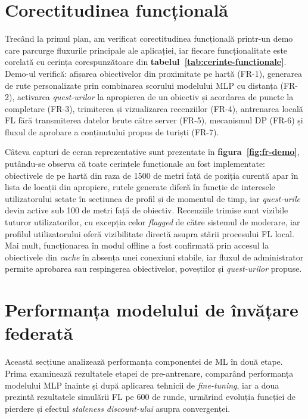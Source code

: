 \documentclass[12pt,a4paper]{report}
\begin{document}
\section{Corectitudinea funcțională}

Trecând la primul plan, am verificat corectitudinea funcțională printr-un demo care parcurge fluxurile principale ale aplicației, iar fiecare funcționalitate este corelată cu cerința corespunzătoare din \textbf{tabelul~\ref{tab:cerinte-functionale}}. Demo-ul verifică: afișarea obiectivelor din proximitate pe hartă (FR-1), generarea de rute personalizate prin combinarea scorului modelului MLP cu distanța (FR-2), activarea \textit{quest-urilor} la apropierea de un obiectiv și acordarea de puncte la completare (FR-3), trimiterea și vizualizarea recenziilor (FR-4), antrenarea locală FL fără transmiterea datelor brute către server (FR-5), mecanismul DP (FR-6) și fluxul de aprobare a conținutului propus de turiști (FR-7).

Câteva capturi de ecran reprezentative sunt prezentate în \textbf{figura~\ref{fig:fr-demo}}, putându-se observa că toate cerințele funcționale au fost implementate: obiectivele de pe hartă din raza de 1500 de metri față de poziția curentă apar în lista de locații din apropiere, rutele generate diferă în funcție de interesele utilizatorului setate în secțiunea de profil și de momentul de timp, iar \textit{quest-urile} devin active sub 100 de metri față de obiectiv. Recenziile trimise sunt vizibile tuturor utilizatorilor, cu excepția celor \textit{flagged} de către sistemul de moderare, iar profilul utilizatorului oferă vizibilitate directă asupra stării procesului FL local. Mai mult, funcționarea în modul offline a fost confirmată prin accesul la obiectivele din \textit{cache} în absența unei conexiuni stabile, iar fluxul de administrator permite aprobarea sau respingerea obiectivelor, poveștilor și \textit{quest-urilor} propuse.

\section{Performanța modelului de învățare federată}

Această secțiune analizează performanța componentei de ML în două etape. Prima examinează rezultatele etapei de pre-antrenare, comparând performanța modelului MLP înainte și după aplicarea tehnicii de \textit{fine-tuning}, iar a doua prezintă rezultatele simulării FL pe 600 de runde, urmărind evoluția funcției de pierdere și efectul \textit{staleness discount-ului} asupra convergenței.
\end{document}
